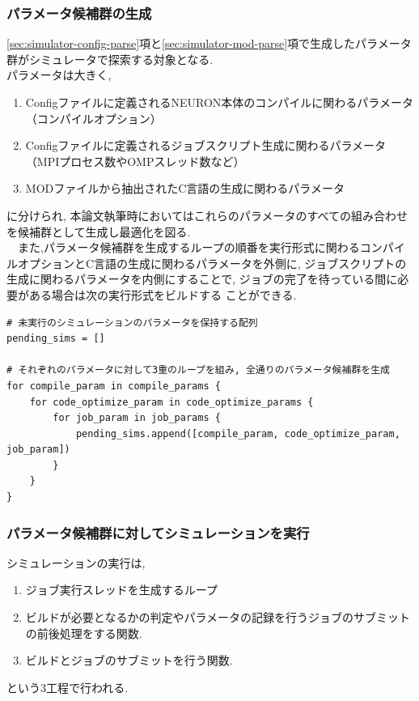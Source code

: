 \subsubsection{パラメータ候補群の生成}
\ref{sec:simulator-config-parse}項と\ref{sec:simulator-mod-parse}項で生成したパラメータ群がシミュレータで探索する対象となる.\\
パラメータは大きく,
\begin{enumerate}
\item Configファイルに定義されるNEURON本体のコンパイルに関わるパラメータ（コンパイルオプション）
\item Configファイルに定義されるジョブスクリプト生成に関わるパラメータ（MPIプロセス数やOMPスレッド数など）
\item MODファイルから抽出されたC言語の生成に関わるパラメータ
\end{enumerate}
に分けられ, 本論文執筆時においてはこれらのパラメータのすべての組み合わせを候補群として生成し最適化を図る.\\
　また,パラメータ候補群を生成するループの順番を実行形式に関わるコンパイルオプションとC言語の生成に関わるパラメータを外側に,
ジョブスクリプトの生成に関わるパラメータを内側にすることで, ジョブの完了を待っている間に必要がある場合は次の実行形式をビルドする
ことができる.\\
{\footnotesize
\begin{lstlisting}[title=パラメータ候補の生成　疑似コード,frame=single]
# 未実行のシミュレーションのパラメータを保持する配列
pending_sims = []

# それぞれのパラメータに対して3重のループを組み, 全通りのパラメータ候補群を生成
for compile_param in compile_params {
    for code_optimize_param in code_optimize_params {
        for job_param in job_params {
            pending_sims.append([compile_param, code_optimize_param, job_param])
        }
    }
}
\end{lstlisting}
}

\subsubsection{パラメータ候補群に対してシミュレーションを実行}
シミュレーションの実行は,
\begin{enumerate}
\item ジョブ実行スレッドを生成するループ
\item ビルドが必要となるかの判定やパラメータの記録を行うジョブのサブミットの前後処理をする関数.
\item ビルドとジョブのサブミットを行う関数.
\end{enumerate}
という3工程で行われる.

